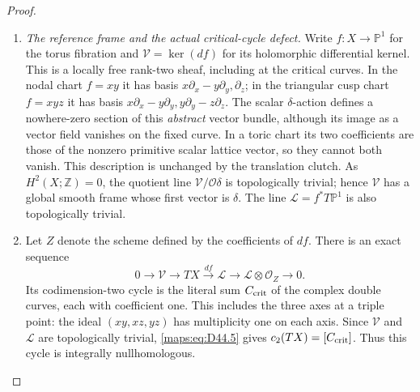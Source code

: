\begin{proof}
\begin{enumerate}[label=\arabic*.,leftmargin=*]
\item \emph{The reference frame and the actual critical-cycle defect.}
Write $f:X\to\mathbb P^1$ for the torus fibration and
$\mathcal V=\ker(df)$ for its holomorphic differential kernel.
This is a locally free rank-two sheaf, including at the critical
curves. In the nodal chart $f=xy$ it has basis
$x\partial_x-y\partial_y,\partial_z$; in the triangular cusp
chart $f=xyz$ it has basis
$x\partial_x-y\partial_y,y\partial_y-z\partial_z$.
The scalar $\delta$-action defines a nowhere-zero section of this
\emph{abstract} vector bundle, although its image as a vector
field vanishes on the fixed curve. In a toric chart its two
coefficients are those of the nonzero primitive scalar lattice
vector, so they cannot both vanish. This description is unchanged
by the translation clutch.
As $H^2(X;\mathbb Z)=0$, the quotient line $\mathcal V/\mathcal O\delta$
is topologically trivial; hence $\mathcal V$ has a global smooth
frame whose first vector is $\delta$. The line
$\mathcal L=f^*T\mathbb P^1$ is also topologically trivial.

\item Let $Z$ denote the scheme defined by the coefficients of $df$.
There is an exact sequence
\[
 0\longrightarrow\mathcal V\longrightarrow TX
  \xrightarrow{df}\mathcal L
  \longrightarrow\mathcal L\otimes\mathcal O_Z
  \longrightarrow0.                                         \tag{D44.5}\label{maps:eq:D44.5}
\]
Its codimension-two cycle is the literal sum $C_{\rm crit}$ of
the complex double curves, each with coefficient one. This
includes the three axes at a triple point: the ideal
$(xy,xz,yz)$ has multiplicity one on each axis. Since
$\mathcal V$ and $\mathcal L$ are topologically trivial,
\eqref{maps:eq:D44.5} gives $c_2(TX)=[C_{\rm crit}]$. Thus this cycle is
integrally nullhomologous.


\end{enumerate}
\end{proof}
